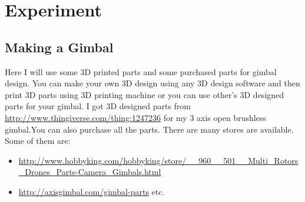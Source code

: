 \documentclass[11pt,a4paper]{article}
\begin{document}
	\section{Experiment}
		\subsection{Making a Gimbal}
		Here I will use some 3D printed parts and some purchased parts for gimbal design. You can make your own 3D design using any 3D design software and then print 3D parts using 3D printing machine or you can use other's 3D designed parts for your gimbal. I got 3D designed parts from \url{http://www.thingiverse.com/thing:1247236} for my 3 axis open brushless gimbal.You can also purchase all the parts. There are many stores are available. Some of them are:
		\begin{itemize}
			\item \url{http://www.hobbyking.com/hobbyking/store/__960__501__Multi_Rotors_Drones_Parts-Camera_Gimbals.html}
			\item \url{http://axisgimbal.com/gimbal-parts} etc.
		\end{itemize}
\end{document}
